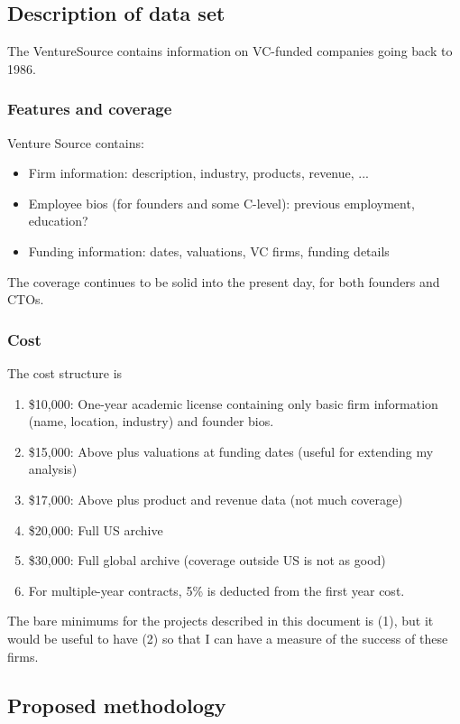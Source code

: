 \documentclass[12pt,english]{article}
\theoremstyle{remark}
\begin{document}
\subsection{Description of data set}

The VentureSource contains information on VC-funded companies going back to 1986. 

\subsubsection{Features and coverage}

Venture Source contains:
\begin{itemize}
	\item Firm information: description, industry, products, revenue, ...
	\item Employee bios (for founders and some C-level): previous employment, education?
	\item Funding information: dates, valuations, VC firms, funding details
\end{itemize}

The coverage continues to be solid into the present day, for both founders and CTOs. 

\subsubsection{Cost}

The cost structure is
\begin{enumerate}
	\item \$10,000: One-year academic license containing only basic firm information (name, location, industry) and founder bios.
	\item \$15,000: Above plus valuations at funding dates (useful for extending my analysis)
	\item \$17,000: Above plus product and revenue data (not much coverage)
	\item \$20,000: Full US archive
	\item \$30,000: Full global archive (coverage outside US is not as good)
	\item For multiple-year contracts, 5\% is deducted from the first year cost.
\end{enumerate}

The bare minimums for the projects described in this document is (1), but it would be useful to have (2) so that I can have a measure of the success of these firms. 

\subsection{Proposed methodology}
\end{document}
